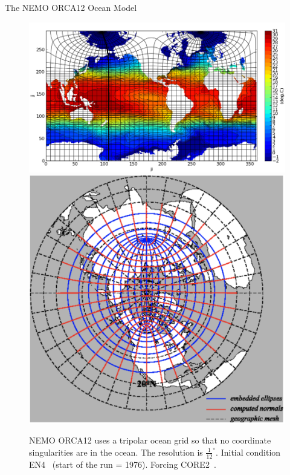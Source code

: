 \documentclass[usenames, dvipsnames]{beamer}
\begin{document}
\begin{frame}{The NEMO ORCA12 Ocean Model~\cite{madec2015nemo}}
\vspace{-20pt}
\begin{figure}[htb!]
    \centering
    \hspace{-30pt}\includegraphics[width=0.74\linewidth]{images/example-images/fig-irregular.png}
     \includegraphics[width=0.30\linewidth]{images/example-images/nemo-poles.png}

    \vspace{-7pt}

    \caption{NEMO ORCA12 uses a tripolar ocean grid so that no coordinate singularities are in the ocean.
     The resolution is $\frac{1}{12}^{\circ}$.
      Initial condition EN4~\cite{good2013en4, HadObs} (start of the run = 1976).
Forcing CORE2~\cite{griffies2012datasets,large2009global}.}

    \label{fig:}
\end{figure}
\end{frame}
\end{document}
